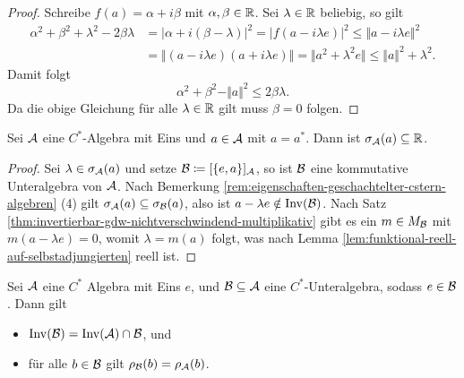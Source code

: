 \begin{proof}
    Schreibe $f(a) = \alpha + i \beta$ mit $\alpha, \beta \in \mathbb{R}$. Sei $\lambda \in \mathbb{R}$ beliebig, so gilt
    \begin{align*}
        \alpha^2 + \beta^2 + \lambda^2 - 2 \beta \lambda &= \vert \alpha + i(\beta - \lambda) \vert^2 = \vert f(a - i \lambda e) \vert^2 \leq \Vert a - i \lambda e \Vert^2 \\
        &= \Vert (a - i \lambda e) (a + i \lambda e) \Vert = \Vert a^2 + \lambda^2 e \Vert \leq \Vert a \Vert^2 + \lambda^2.
    \end{align*}
    Damit folgt
    $$ \alpha^2 + \beta^2 - \Vert a \Vert^2 \leq 2 \beta \lambda. $$
    Da die obige Gleichung für alle $\lambda \in \mathbb{R}$ gilt muss $\beta = 0$ folgen.
\end{proof}

\begin{corollary} \label{cor:selbstadjungiert-reelles-spektrum}
    Sei $\mathcal{A}$ eine $C^*$-Algebra mit Eins und $a \in \mathcal{A}$ mit $a = a^*$. Dann ist $\sigma_{\mathcal{A}}(a) \subseteq \mathbb{R}$.
\end{corollary}

\begin{proof}
    Sei $\lambda \in \sigma_{\mathcal{A}}(a)$ und setze $\mathcal{B} \coloneqq [\{ e, a \}]_{\mathcal{A}}$, so ist $\mathcal{B}$ eine kommutative Unteralgebra von $\mathcal{A}$. Nach Bemerkung \ref{rem:eigenschaften-geschachtelter-cstern-algebren} (4) gilt $\sigma_{\mathcal{A}}(a) \subseteq \sigma_{\mathcal{B}}(a)$, also ist $a - \lambda e \notin \operatorname*{Inv}(\mathcal{B})$. Nach Satz \ref{thm:invertierbar-gdw-nichtverschwindend-multiplikativ} gibt es ein $m \in M_{\mathcal{B}}$ mit $m(a - \lambda e) = 0$, womit $\lambda = m(a)$ folgt, was nach Lemma \ref{lem:funktional-reell-auf-selbstadjungierten} reell ist.
\end{proof}

\begin{theorem}
    Sei $\mathcal{A}$ eine $C^*$ Algebra mit Eins $e$, und $\mathcal{B} \subseteq \mathcal{A}$ eine $C^*$-Unteralgebra, sodass $e \in \mathcal{B}$. Dann gilt
    \begin{itemize}
        \item $\operatorname*{Inv}(\mathcal{B}) = \operatorname*{Inv}(\mathcal{A}) \cap \mathcal{B}$, und
        \item für alle $b \in \mathcal{B}$ gilt $\rho_{\mathcal{B}}(b) = \rho_{\mathcal{A}}(b)$.
    \end{itemize}
\end{theorem}

